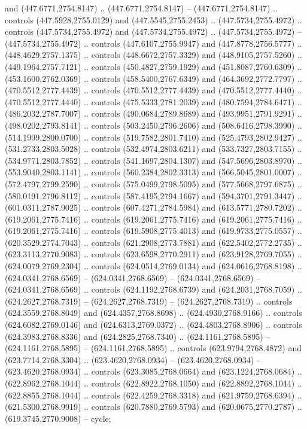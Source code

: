 \begin{scope}[shift={(296.85925,-6.26562)}]
\begin{scope}[shift={(-138.30846,-2572.6617)}]
\begin{scope}
        and (447.6771,2754.8147) .. (447.6771,2754.8147) -- (447.6771,2754.8147) ..
        controls (447.5928,2755.0129) and (447.5545,2755.2453) .. (447.5734,2755.4972)
        .. controls (447.5734,2755.4972) and (447.5734,2755.4972) ..
        (447.5734,2755.4972) -- (447.5734,2755.4972) .. controls (447.6107,2755.9947)
        and (447.8778,2756.5777) .. (448.4629,2757.1375) .. controls
        (448.6672,2757.3329) and (448.9105,2757.5260) .. (449.1964,2757.7121) ..
        controls (450.4827,2759.1929) and (451.8087,2760.6309) .. (453.1600,2762.0369)
        .. controls (458.5400,2767.6349) and (464.3692,2772.7797) ..
        (470.5512,2777.4439) .. controls (470.5512,2777.4439) and (470.5512,2777.4440)
        .. (470.5512,2777.4440) .. controls (475.5333,2781.2039) and
        (480.7594,2784.6471) .. (486.2032,2787.7007) .. controls (490.0684,2789.8689)
        and (493.9951,2791.9291) .. (498.0202,2793.8141) .. controls
        (503.2450,2796.2606) and (508.6416,2798.3990) .. (514.1999,2800.0700) ..
        controls (519.7582,2801.7410) and (525.4793,2802.9427) .. (531.2733,2803.5028)
        .. controls (532.4974,2803.6211) and (533.7327,2803.7155) ..
        (534.9771,2803.7852) .. controls (541.1697,2804.1307) and (547.5696,2803.8970)
        .. (553.9040,2803.1141) .. controls (560.2384,2802.3313) and
        (566.5045,2801.0007) .. (572.4797,2799.2590) .. controls (575.0499,2798.5095)
        and (577.5668,2797.6875) .. (580.0191,2796.8112) .. controls
        (587.4195,2794.1667) and (594.3701,2791.3447) .. (601.0311,2787.9025) ..
        controls (607.4271,2784.5984) and (613.5771,2780.7202) .. (619.2061,2775.7416)
        .. controls (619.2061,2775.7416) and (619.2061,2775.7416) ..
        (619.2061,2775.7416) .. controls (619.5908,2775.4013) and (619.9733,2775.0557)
        .. (620.3529,2774.7043) .. controls (621.2908,2773.7881) and
        (622.5402,2772.2735) .. (623.3113,2770.9083) .. controls (623.6598,2770.2911)
        and (623.9128,2769.7055) .. (624.0079,2769.2304) .. controls
        (624.0514,2769.0134) and (624.0616,2768.8198) .. (624.0341,2768.6569) --
        (624.0341,2768.6569) -- (624.0341,2768.6569) -- (624.0341,2768.6569) ..
        controls (624.1192,2768.6739) and (624.2031,2768.7059) .. (624.2627,2768.7319)
        -- (624.2627,2768.7319) -- (624.2627,2768.7319) .. controls
        (624.3559,2768.8049) and (624.4357,2768.8698) .. (624.4930,2768.9166) ..
        controls (624.6082,2769.0146) and (624.6313,2769.0372) .. (624.4803,2768.8906)
        .. controls (624.3983,2768.8336) and (624.2825,2768.7340) ..
        (624.1161,2768.5895) -- (624.1161,2768.5895) -- (624.1161,2768.5895) ..
        controls (623.9794,2768.4872) and (623.7714,2768.3304) .. (623.4620,2768.0934)
        -- (623.4620,2768.0934) -- (623.4620,2768.0934) .. controls
        (623.3085,2768.0664) and (623.1224,2768.0684) .. (622.8962,2768.1044) ..
        controls (622.8922,2768.1050) and (622.8892,2768.1044) .. (622.8855,2768.1044)
        .. controls (622.4259,2768.3318) and (621.9759,2768.6394) ..
        (621.5300,2768.9919) .. controls (620.7880,2769.5793) and (620.0675,2770.2787)
        .. (619.3745,2770.9008) -- cycle;


\end{scope}
\end{scope}
\end{scope}
